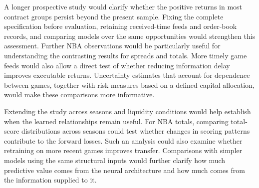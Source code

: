 \documentclass[12pt,a4paper,oneside]{report}
\begin{document}
A longer prospective study would clarify whether the positive returns in
most contract groups persist beyond the present sample. Fixing the complete
specification before evaluation, retaining received-time feeds and order-book
records, and comparing models over the same opportunities would strengthen
this assessment. Further NBA observations would be particularly useful for
understanding the contrasting results for spreads and totals. More timely
game feeds would also allow a direct test of whether reducing information
delay improves executable returns. Uncertainty estimates that account for
dependence between games, together with risk measures based on a defined
capital allocation, would make these comparisons more informative.

Extending the study across seasons and liquidity conditions would help
establish when the learned relationships remain useful. For NBA totals,
comparing total-score distributions across seasons could test whether changes
in scoring patterns contribute to the forward losses. Such an analysis could
also examine whether retraining on more recent games improves transfer.
Comparisons with simpler models using the same structural inputs would
further clarify how much predictive value comes from the neural architecture
and how much comes from the information supplied to it.
\end{document}
